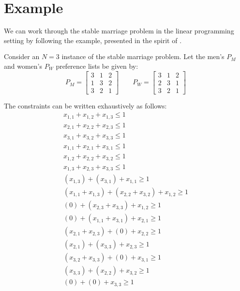 \documentclass[twoside]{article}
\begin{document}
\section{Example}
We can work through the stable marriage problem in the linear programming setting by following the example, presented in the spirit of \cite{maritalBliss}.

Consider an $N=3$ instance of the stable marriage problem. Let the men's $P_M$ and women's $P_W$ preference lists be given by:
\[
P_M = \begin{bmatrix}
3 & 1  & 2\\
1&3&2\\
3&2&1
\end{bmatrix}
\qquad P_W = \begin{bmatrix}
3&1&2\\
2&3&1\\
3&2&1
\end{bmatrix}
\]

The constraints can be written exhaustively as follows:
\begin{align*}
    x_{1,1} + x_{1,2} + x_{1,3} \leq 1 \tag{A1}\\
    x_{2,1} + x_{2,2} + x_{2,3} \leq 1 \tag{A2}\\
    x_{3,1} + x_{3,2} + x_{3,3} \leq 1 \tag{A3} \label{constraintA3}\\
    x_{1,1} + x_{2,1} + x_{3,1} \leq 1 \tag{B1}\\
    x_{1,2} + x_{2,2} + x_{3,2} \leq 1 \tag{B2}\\
    x_{1,3} + x_{2,3} + x_{3,3} \leq 1 \tag{B3} \label{constraintB3}\\
    (x_{1,3}) + (x_{3,1}) + x_{1,1} \geq 1 \tag{D[1,1]}\\
    (x_{1,1} + x_{1,3}) + (x_{2,2} + x_{3,2}) + x_{1,2} \geq 1 \tag{D[1,2]}\\
    (0) + (x_{2,3} + x_{3,3}) + x_{1,2} \geq 1 \tag{D[1,3]}\\
    (0) + (x_{1,1} + x_{3,1}) + x_{2,1} \geq 1 \tag{D[2,1]}\\
    (x_{2,1} + x_{2,3}) + (0) + x_{2,2} \geq 1 \tag{D[2,2]}\\
    (x_{2,1}) + (x_{3,3}) + x_{2,3} \geq 1 \tag{D[2,3]}\\
    (x_{3,2} + x_{3,3}) + (0) + x_{3,1} \geq 1 \tag{D[3,1]}\\
    (x_{3,3}) + (x_{2,2}) + x_{3,2} \geq 1 \tag{D[3,2]}\\
    (0) + (0) + x_{3,3} \geq 1 \tag{D[3,3]} \label{constraintD33}
\end{align*}
\end{document}

